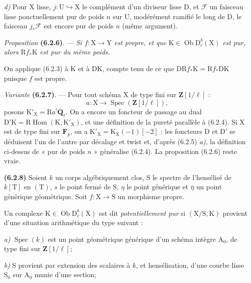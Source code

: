 \documentclass[11pt,leqno]{article}
\begin{document}
\textit{d)} Pour \(\mathrm{X}\) lisse,
\(j:\mathrm{U}\hookrightarrow\mathrm{X}\) le complément d’un
diviseur lisse \(\mathrm{D}\), et \(\mathscr{F}\) un faisceau lisse
ponctuellement pur de poids \(n\) sur \(\mathrm{U}\), modérément
ramifié le long de \(\mathrm{D}\), le faisceau \(j_*\mathscr{F}\)
est encore pur de poids \(n\) (même argument).

\textit{Proposition} \textbf{(6.2.6)}. — \textit{Si
\(f:\mathrm{X}\to\mathrm{Y}\) est propre, et que
\(\mathrm{K}\in\operatorname{Ob}\mathrm{D}_c^b(\mathrm{X})\) est
pur, alors \(\mathrm{R}f_*\mathrm{K}\) est pur du même poids.}

On applique (6.2.3) à \(\mathrm{K}\) et à \(\mathrm{D}\mathrm{K}\),
compte tenu de ce que
\(\mathrm{D}\mathrm{R}f_*\mathrm{K}
=\mathrm{R}f_*\mathrm{D}\mathrm{K}\) puisque \(f\) est propre.

\textit{Variante} \textbf{(6.2.7)}. — Pour tout schéma \(\mathrm{X}\)
de type fini sur \(\mathbf{Z}[1/\ell]\) :
\[
a:\mathrm{X}\to\operatorname{Spec}(\mathbf{Z}[1/\ell]),
\]
posons \(\mathrm{K}'_{\mathrm{X}}=\mathrm{R}a^!\overline{\mathbf{Q}}_\ell\).
On a encore un foncteur de passage au dual
\(\mathrm{D}'\mathrm{K}
=\mathrm{R}\operatorname{Hom}(\mathrm{K},\mathrm{K}'_{\mathrm{X}})\),
et une définition de la pureté parallèle à (6.2.4). Si
\(\mathrm{X}\) est de type fini sur \(\mathbf{F}_p\), on a
\(\mathrm{K}'_{\mathrm{X}}=\mathrm{K}_{\mathrm{X}}(-1)[-2]\) :
les foncteurs \(\mathrm{D}\) et \(\mathrm{D}'\) se déduisent l’un
de l’autre par décalage et twist et, d’après (6.2.5) \textit{a)},
la définition ci-dessus de « pur de poids \(n\) » généralise
(6.2.4). La proposition (6.2.6) reste vraie.

\textbf{(6.2.8)} Soient \(k\) un corps algébriquement clos,
\(\mathrm{S}\) le spectre de l’hensélisé de \(k[\mathrm{T}]\) en
\((\mathrm{T})\), \(s\) le point fermé de \(\mathrm{S}\), \(\eta\)
le point générique et \(\bar{\eta}\) un point générique géométrique.
Soit \(f:\mathrm{X}\to\mathrm{S}\) un morphisme propre.

Un complexe \(\mathrm{K}\in\operatorname{Ob}\mathrm{D}_c^b(\mathrm{X})\)
est dit \textit{potentiellement pur} si
\((\mathrm{X}/\mathrm{S},\mathrm{K})\) provient d’une situation
arithmétique du type suivant :

\textit{a)} \(\operatorname{Spec}(k)\) est un point géométrique
générique d’un schéma intègre \(\mathrm{A}_0\), de type fini sur
\(\mathbf{Z}[1/\ell]\);

\textit{b)} \(\mathrm{S}\) provient par extension des scalaires à
\(k\), et hensélisation, d’une courbe lisse \(\mathrm{S}_0\) sur
\(\mathrm{A}_0\) munie d’une section;
\end{document}

